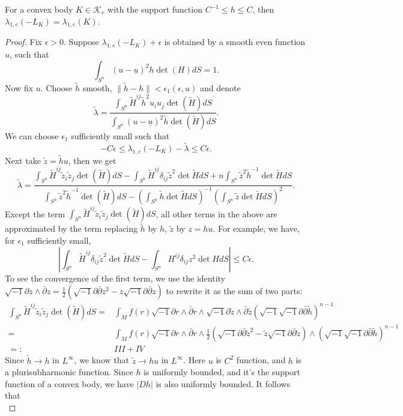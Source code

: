 \documentclass[10pt,a4paper]{amsart}
\def\cK{{\mathcal K}}
\newcommand{\ddc}{\sqrt{-1}\partial\bar\partial}
\begin{document}
\begin{prop}
    For a convex body $K\in \cK_e$ with the support function $C^{-1}\leq h\leq C$, then $\lambda_{1, e}(-L_K)=\lambda_{1, e}(K)$. 
\end{prop}

\begin{proof}
Fix $\epsilon>0$.
    Suppose $\lambda_{1, e}(-L_K)+\epsilon$ is obtained by a smooth even function $u$, such that 
    \[
    \int_{S^n}{(u-\underline u)^2} h\det(H)dS=1.
    \]
    Now fix $u$. Choose $\tilde h$ smooth, $\|\tilde h-h\|<\epsilon_{1}(\epsilon, u)$  and denote
    \[
    \tilde \lambda=\frac{\displaystyle \int_{S^n}\tilde H^{ij}\tilde h^2u_iu_j\det(\tilde H)dS}{\displaystyle\int_{S^n}{(u-\underline u)^2} \tilde h\det(\tilde H)dS}.
    \]
    We can choose $\epsilon_1$ sufficiently small such that 
    \[
   -C\epsilon\leq \lambda_{1, e}(-L_K)-\tilde \lambda \leq C\epsilon.
    \]
    Next take $\tilde{z}=\tilde h u$, then we get 
    \[
    \tilde \lambda=\frac{\displaystyle \int_{S^n}\tilde H^{ij}\tilde{z}_i\tilde{z}_j\det(\tilde H)dS-\int_{S^n}\tilde H^{ij}\delta_{ij}\tilde{z}^2 \det{\tilde H}dS+n\int_{S^n}\tilde{z}^2\tilde h^{-1}\det{\tilde H}dS}{\displaystyle\int_{S^n}\tilde{z}^2\tilde h^{-1}\det(\tilde H)dS-\left(\int_{S^n}\tilde h\det{\tilde H}dS\right)^{-1}\left(\int_{S^n}\tilde{z}\det{\tilde H}dS\right)^2}.
    \] 
Except the term $\displaystyle \int_{S^n}\tilde H^{ij}\tilde{z}_i\tilde{z}_j\det(\tilde H)dS$, all other terms in the above are approximated by the term replacing $\tilde h$ by $h$, $\tilde{z}$ by $z=hu$. For example, we have, for $\epsilon_1$ sufficiently small, 
\[
\left|\int_{S^n}\tilde H^{ij}\delta_{ij}\tilde{z}^2 \det{\tilde H}dS-\int_{S^n} H^{ij}\delta_{ij}z^2 \det{ H}dS\right|\leq C\epsilon.
\]
To see the convergence of the first term, we use the identity $\sqrt{-1}\partial z\wedge\bar{\partial}z=\frac{1}{2}(\ddc z^2-z\ddc z)$ to rewrite it as the sum of two parts:\[
\begin{aligned}
    \int_{S^n}\tilde{H}^{ij}\tilde{z}_i\tilde{z}_j\det(\tilde{H})dS=&\int_{M}f(r)\sqrt{-1}\partial r\wedge\bar{\partial}r\wedge \sqrt{-1}\partial \tilde{z}\wedge\bar{\partial}\tilde{z}(\sqrt{-1}\ddc \tilde{h})^{n-1}\\
    =&\int_{M}f(r)\sqrt{-1}\partial r\wedge\bar{\partial}r\wedge\frac{1}{2}(\ddc \tilde{z}^2-\tilde{z}\ddc \tilde{z})\wedge(\sqrt{-1}\ddc \tilde{h})^{n-1}\\
    =:&III+IV
\end{aligned}
\]
Since $\tilde{h}\rightarrow h$ in $L^\infty$, we know that $\tilde{z}\rightarrow hu$ in $L^\infty$. Here $u$ is $C^2$ function, and $h$ is a plurisubharmonic function. Since $h$ is uniformly bounded, and it's the support function of a convex body, we have $|D h|$ is also uniformly bounded. It follows that \[
\]
\end{proof}
\end{document}
